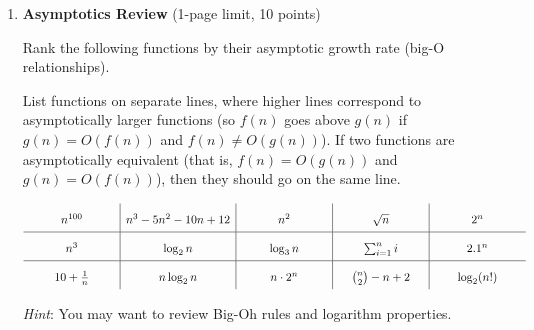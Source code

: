 \documentclass[11pt]{article}
\begin{document}
\begin{enumerate}
\begin{enumerate}
\end{enumerate}

\item {\bf Asymptotics Review} (1-page limit, 10 points)

Rank the following functions by their asymptotic growth rate (big-O relationships). 

List functions on separate lines, where higher lines correspond to asymptotically larger functions (so $f(n)$ goes above $g(n)$ if $g(n)=O(f(n))$ and $f(n)\neq O(g(n))$). If two functions are asymptotically equivalent (that is, $f(n)=O(g(n))$ and $g(n)=O(f(n))$), then they should go on the same line.


\[
\renewcommand{\arraystretch}{2}
\begin{array}{c|c|c|c|c}
 \makebox[1in]{\ensuremath{n^{100}}}& 
 n^3 - 5n^2 -10 n + 12 & 
  \makebox[1in]{\ensuremath{n^{2} }}& 
  \makebox[1in]{\ensuremath{\sqrt{n} }} & 
  \makebox[1in]{\ensuremath{2^n }}
\\ \hline 
n^3 & \log_2 n & \log_3 n  & \sum_{i=1}^n i & 2.1^n\\ \hline 
10 +\frac{1}{n} & n\log_2{n} & n\cdot 2^n & \binom{n}{2} - n + 2 &\log_2(n!)\\
\end{array}
\renewcommand{\arraystretch}{1}
\]

\emph{Hint}: You may want to review Big-Oh rules and logarithm properties.

\end{enumerate}
\end{document}
